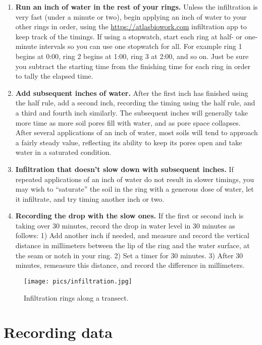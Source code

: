 \documentclass[11pt,letterpaper,twoside,onecolumn]{memoir}
\begin{document}
\begin{enumerate}
\item \textbf{Run an inch of water in the rest of your rings.} Unless the infiltration is very fast (under a minute or two), begin applying an inch of water to your other rings in order, using the \url{https://atlasbiowork.com} infiltration app to keep track of the timings. If using a stopwatch, start each ring at half- or one-minute intervals so you can use one stopwatch for all. For example ring 1 begins at 0:00, ring 2 begins at 1:00, ring 3 at 2:00, and so on. Just be sure you subtract the starting time from the finishing time for each ring in order to tally the elapsed time.

\item \textbf{Add subsequent inches of water.} After the first inch has finished using the half rule, add a second inch, recording the timing using the half rule, and a third and fourth inch similarly. The subsequent inches will generally take more time as more soil pores fill with water, and as pore space collapses.  After several applications of an inch of water, most soils will tend to approach a fairly steady value, reflecting its ability to keep its pores open and take water in a saturated condition.

\item \textbf{Infiltration that doesn't slow down with subsequent inches.}  If repeated applications of an inch of water do not result in slower timings, you may wish to ``saturate'' the soil in the ring with a generous dose of water, let it infiltrate, and try timing another inch or two.

\item \textbf{Recording the drop with the slow ones.}  If the first or second inch is taking over 30 minutes, record the drop in water level in 30 minutes as follows: 1) Add another inch if needed, and measure and record the vertical distance in millimeters between the lip of the ring and the water surface, at the seam or notch in your ring. 2) Set a timer for 30 minutes. 3) After 30 minutes, remeasure this distance, and record the difference in millimeters.


\end{enumerate}

\begin{figure}
\texttt{[image: pics/infiltration.jpg]}
\caption*{Infiltration rings along a transect.}
\end{figure}



\section*{Recording data}
\end{document}
